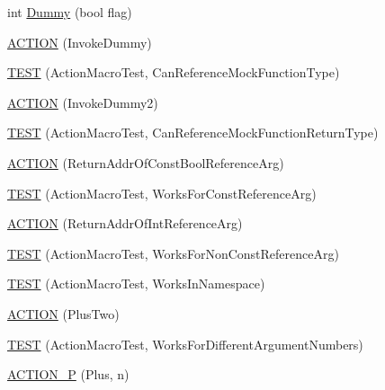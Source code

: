 \begin{DoxyCompactItemize}
int \mbox{\hyperlink{namespacetesting_1_1gmock__generated__actions__test_ab91824b86c842e024337b6de45eb8cdc}{Dummy}} (bool flag)
\item 
\mbox{\hyperlink{namespacetesting_1_1gmock__generated__actions__test_ae6806220035fcf097362dd736db4b03b}{A\+C\+T\+I\+ON}} (Invoke\+Dummy)
\item 
\mbox{\hyperlink{namespacetesting_1_1gmock__generated__actions__test_a1d3b8bb25c79d7e2167234f87935ea1e}{T\+E\+ST}} (Action\+Macro\+Test, Can\+Reference\+Mock\+Function\+Type)
\item 
\mbox{\hyperlink{namespacetesting_1_1gmock__generated__actions__test_a9f274ffcf4211cb03b4390cb0cc1ef1c}{A\+C\+T\+I\+ON}} (Invoke\+Dummy2)
\item 
\mbox{\hyperlink{namespacetesting_1_1gmock__generated__actions__test_a384a114235b474bb4318754e0d16f559}{T\+E\+ST}} (Action\+Macro\+Test, Can\+Reference\+Mock\+Function\+Return\+Type)
\item 
\mbox{\hyperlink{namespacetesting_1_1gmock__generated__actions__test_a78725817afcd5d7f19df2bdc2d41b9db}{A\+C\+T\+I\+ON}} (Return\+Addr\+Of\+Const\+Bool\+Reference\+Arg)
\item 
\mbox{\hyperlink{namespacetesting_1_1gmock__generated__actions__test_a8b4dadfc32c71e754d6ba3daae382715}{T\+E\+ST}} (Action\+Macro\+Test, Works\+For\+Const\+Reference\+Arg)
\item 
\mbox{\hyperlink{namespacetesting_1_1gmock__generated__actions__test_aeb01205293078272696bd0c19ce4e848}{A\+C\+T\+I\+ON}} (Return\+Addr\+Of\+Int\+Reference\+Arg)
\item 
\mbox{\hyperlink{namespacetesting_1_1gmock__generated__actions__test_a093a824ac7e8ec775a8f5d7b11d223a9}{T\+E\+ST}} (Action\+Macro\+Test, Works\+For\+Non\+Const\+Reference\+Arg)
\item 
\mbox{\hyperlink{namespacetesting_1_1gmock__generated__actions__test_af75a9a5b9d6a1cf718a58f030a5a9133}{T\+E\+ST}} (Action\+Macro\+Test, Works\+In\+Namespace)
\item 
\mbox{\hyperlink{namespacetesting_1_1gmock__generated__actions__test_a0eef2f885ccb1e4fac88a910f0fc5c2e}{A\+C\+T\+I\+ON}} (Plus\+Two)
\item 
\mbox{\hyperlink{namespacetesting_1_1gmock__generated__actions__test_acb98f6208678d9f5500a0c2c095b8cd0}{T\+E\+ST}} (Action\+Macro\+Test, Works\+For\+Different\+Argument\+Numbers)
\item 
\mbox{\hyperlink{namespacetesting_1_1gmock__generated__actions__test_ac081154b3ae2f099bd5be853cacfdaa4}{A\+C\+T\+I\+O\+N\+\_\+P}} (Plus, n)

\end{DoxyCompactItemize}
